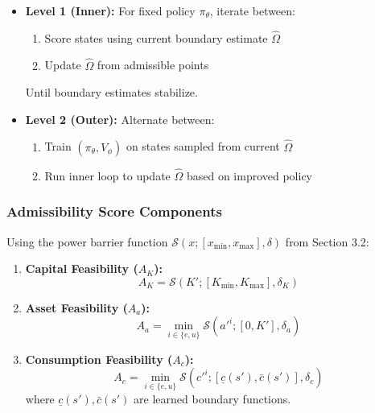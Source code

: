 \begin{itemize}
    \item \textbf{Level 1 (Inner):} For fixed policy $\pi_\theta$, iterate between:
    \begin{enumerate}
        \item Score states using current boundary estimate $\hat{\Omega}$
        \item Update $\hat{\Omega}$ from admissible points
    \end{enumerate}
    Until boundary estimates stabilize.
    
    \item \textbf{Level 2 (Outer):} Alternate between:
    \begin{enumerate}
        \item Train $(\pi_\theta, V_\phi)$ on states sampled from current $\hat{\Omega}$
        \item Run inner loop to update $\hat{\Omega}$ based on improved policy
    \end{enumerate}
\end{itemize}

\subsubsection{Admissibility Score Components}

Using the power barrier function $\mathcal{S}(x; [x_{\min}, x_{\max}], \delta)$ from Section 3.2:

\begin{enumerate}
    \item \textbf{Capital Feasibility ($A_K$):}
    \begin{equation}
        A_K = \mathcal{S}(K'; [K_{\min}, K_{\max}], \delta_K)
    \end{equation}
    
    \item \textbf{Asset Feasibility ($A_a$):}
    \begin{equation}
        A_a = \min_{i \in \{e, u\}} \mathcal{S}(a'^i; [0, K'], \delta_a)
    \end{equation}
    
    \item \textbf{Consumption Feasibility ($A_c$):}
    \begin{equation}
        A_c = \min_{i \in \{e, u\}} \mathcal{S}(c'^i; [\underline{c}(s'), \bar{c}(s')], \delta_c)
    \end{equation}
    where $\underline{c}(s'), \bar{c}(s')$ are learned boundary functions.
\end{enumerate}


